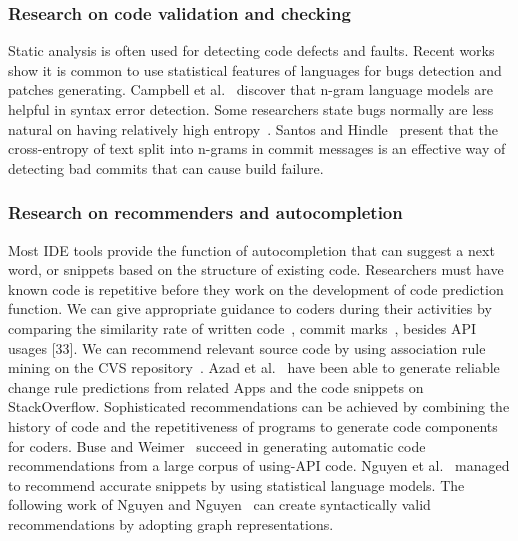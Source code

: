 \documentclass[runningheads]{llncs}
\begin{document}
\subsubsection{Research on code validation and checking\\}
Static analysis is often used for detecting code defects and faults. Recent works show it is common to use statistical features of languages for bugs detection and patches generating. Campbell et al.~\cite{ref_campbell2014} discover that n-gram language models are helpful in syntax error detection. Some researchers state bugs normally are less natural on having relatively high entropy~\cite{ref_jimenez2018}. Santos and Hindle~\cite{ref_santos2016} present that the cross-entropy of text split into n-grams in commit messages is an effective way of detecting bad commits that can cause build failure.

\subsubsection{Research on recommenders and autocompletion\\}
Most IDE tools provide the function of autocompletion that can suggest a next word, or snippets based on the structure of existing code. Researchers must have known code is repetitive before they work on the development of code prediction function. We can give appropriate guidance to coders during their activities by comparing the similarity rate of written code~\cite{ref_atkins1998}, commit marks~\cite{ref_chen2001}, besides API usages [33].  We can recommend relevant source code by using association rule mining on the CVS repository~\cite{ref_zimmermann2005}. Azad et al.~\cite{ref_azad2017} have been able to generate reliable change rule predictions from related Apps and the code snippets on StackOverflow. Sophisticated recommendations can be achieved by combining the history of code and the repetitiveness of programs to generate code components for coders. Buse and Weimer~\cite{ref_azad2017} succeed in generating automatic code recommendations from a large corpus of using-API code. Nguyen et al.~\cite{ref_nguyen2013} managed to recommend accurate snippets by using statistical language models. The following work of Nguyen and Nguyen~\cite{ref_nguyen2013} can create syntactically valid recommendations by adopting graph representations.
\end{document}
